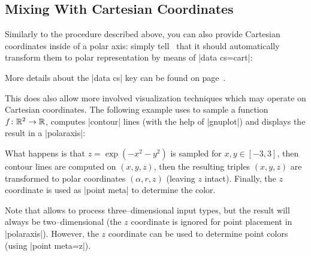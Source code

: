 {\subsection{Mixing With Cartesian Coordinates}
\label{sec:polar:cart}
Similarly to the procedure described above, you can also provide Cartesian coordinates inside of a polar axis: simply tell \PGFPlots\ that it should automatically transform them to polar representation by means of |data cs=cart|:
\begin{codeexample}[]
\end{codeexample}
\noindent More details about the |data cs| key can be found on page~\pageref{key:data:cs}.

This does also allow more involved visualization techniques which may operate on Cartesian coordinates. The following example uses  to sample a function $f\colon \mathbb{R}^2 \to \mathbb{R}$, computes |contour| lines (with the help of |gnuplot|) and displays the result in a |polaraxis|:
\pgfplotsexpensiveexample
\begin{codeexample}[]
\end{codeexample}
\noindent What happens is that $z=\exp(-x^2-y^2)$ is sampled for $x,y \in [-3,3]$, then contour lines are computed on $(x,y,z)$, then the resulting triples $(x,y,z)$ are transformed to polar coordinates $(\alpha,r,z)$ (leaving $z$ intact). Finally, the $z$ coordinate is used as |point meta| to determine the color.

Note that  allows to process three--dimensional input types, but the result will always be two--dimensional (the $z$ coordinate is ignored for point placement in |polaraxis|). However, the $z$ coordinate can be used to determine point colors (using |point meta=z|).

}
